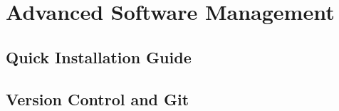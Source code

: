 \chapter{Advanced Software Management}


\section{Quick Installation Guide}


\section{Version Control and Git}

















